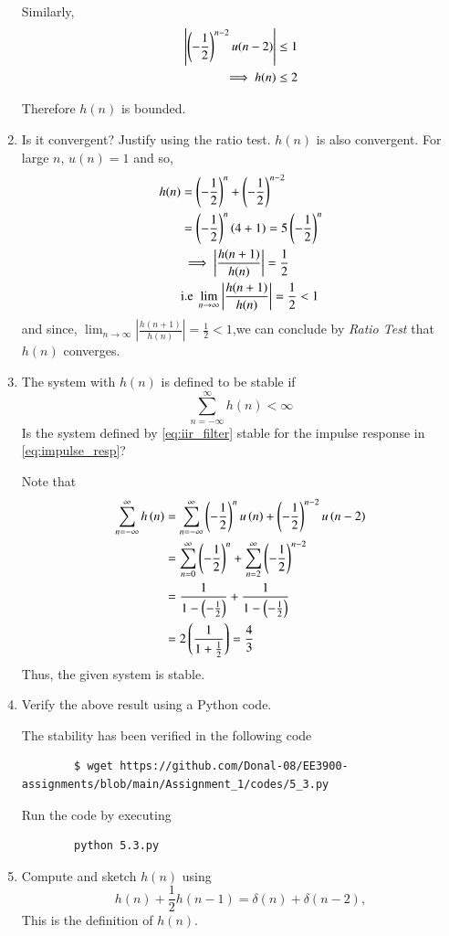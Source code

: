 \documentclass[journal,12pt,twocolumn]{IEEEtran}
\renewcommand\thesection{\arabic{section}}
\begin{document}
\begin{enumerate}[label=\thesection.\arabic*]
	Similarly,
	\begin{align}
		\left\vert\left(-\frac12\right)^{n-2} u(n-2)\right\vert &\le 1 \\
		\implies h(n) &\le 2
	\end{align}
	
	Therefore $h(n)$ is bounded. 
	\item Is it convergent? Justify using the ratio test.
	\solution $h(n)$ is also convergent. For large $n$, $u(n)=1$ and so,
\begin{align}
	h(n) &= \left(-\frac{1}{2}\right)^n + \left(-\frac{1}{2}\right)^{n - 2} \\
		 &= \left(-\frac{1}{2}\right)^{n}\left(4 + 1\right) = 5\left(-\frac{1}{2}\right)^n \\
		 &\implies \left|\frac{h(n + 1)}{h(n)}\right| = \frac{1}{2}\\
		 &\text{i.e  } \lim_{n \to \infty}\left|\frac{h(n + 1)}{h(n)}\right| = \frac{1}{2} < 1
\end{align}
and since, $\lim_{n \to \infty}\left|\frac{h(n + 1)}{h(n)}\right| = \frac{1}{2} < 1$,we can conclude by \textit{Ratio Test} that $h(n)$ converges. 

\item The system with $h(n)$ is defined to be stable if
\begin{equation}
\sum_{n=-\infty}^{\infty}h(n) < \infty
\end{equation}
Is the system defined by \eqref{eq:iir_filter} stable for the impulse response in \eqref{eq:impulse_resp}?

\solution
Note that
\begin{align}
	\sum_{n = -\infty}^{\infty}h\left(n\right) &= \sum_{n = -\infty}^{\infty}\left(-\frac{1}{2}\right)^nu\left(n\right) + \left(-\frac{1}{2}\right)^{n - 2}u\left(n - 2\right) \\
										 &= \sum_{n=0}^{\infty}\left(-\frac12\right)^n + \sum_{n=2}^{\infty}\left(-\frac12\right)^{n-2}\\
										 &= \frac{1}{1 - \left(-\frac12\right)} + \frac{1}{1 - \left(-\frac12\right)} \\
										 &= 2\left(\frac{1}{1 + \frac{1}{2}}\right) = \frac{4}{3}
\end{align}
Thus, the given system is stable.
\item Verify the above result using a Python code. 
	
	\solution The stability has been verified in the following code
	\begin{lstlisting}
		$ wget https://github.com/Donal-08/EE3900-assignments/blob/main/Assignment_1/codes/5_3.py
		\end{lstlisting}
	Run the code by executing
	\begin{lstlisting}
		python 5.3.py
	\end{lstlisting}
\item 
Compute and sketch $h(n)$ using 
\begin{equation}
\label{eq:iir_filter_h}
h(n) + \frac{1}{2}h(n-1) = \delta(n) + \delta(n-2), 
\end{equation}
This is the definition of $h(n)$.


\end{enumerate}
\end{document}
